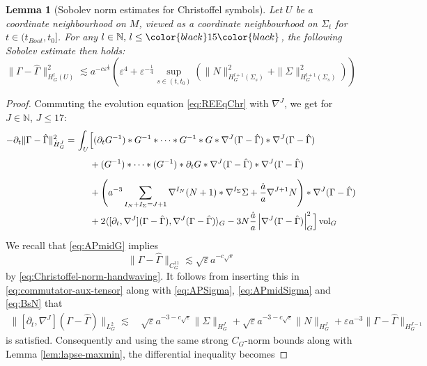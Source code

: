 \documentclass[11pt,leqno,textwidth=10cm]{amsart}
\numberwithin{equation}{section}
\theoremstyle{definition}
\theoremstyle{plain}
\newtheorem{lemma}[definition]{Lemma}
\newcommand{\1}{\mathbbm{1}}
\newcommand{\N}{\mathbb{N}}
\newcommand{\vol}[1]{{\text{\normalfont{vol}}}_{#1}}
\renewcommand{\epsilon}{\varepsilon}
\newcommand{\del}{\partial}
\newcommand{\Gamhat}{\hat{\Gamma}}
\newcommand{\change}[1]{\color{black}#1\color{black}}
\begin{document}
\begin{lemma}[Sobolev norm estimates for Christoffel symbols]\label{lem:int-est-Chr} Let $U$ be a coordinate neighbourhood on $M$, viewed as a coordinate neighbourhood on $\Sigma_t$ for $t\in(t_{Boot},t_0]$. For any $l\in\N,\,l\leq \change{15}$, the following Sobolev estimate then holds:
\begin{equation}\label{eq:norm-est-Chr}
\|\Gamma-\Gamhat\|^2_{H^l_G(U)}\lesssim a^{-c\epsilon^\frac18}\left(\epsilon^4+\epsilon^{-\frac14}\sup_{s\in(t,t_0)}\left(\|N\|_{H^{l+1}_G(\Sigma_s)}^2+\|\Sigma\|_{H^{l+1}_G(\Sigma_s)}^2\right)\right)
\end{equation}
\end{lemma}
\begin{proof}
Commuting the evolution equation \eqref{eq:REEqChr} with $\nabla^J$, we get for $J\in\N$, $J\leq 17$:
\begin{align*}
-\del_t\|\Gamma-\Gamhat\|_{\dot{H}^J_G}^2=&\,\int_U\Bigr[(\del_tG^{-1})\ast G^{-1}\ast\dots\ast G^{-1}\ast G\ast\nabla^J(\Gamma-\Gamhat)\ast\nabla^J(\Gamma-\Gamhat)\\
&\,\phantom{\int_M}+(G^{-1})\ast\dots\ast(G^{-1})\ast\del_tG\ast\nabla^J(\Gamma-\Gamhat)\ast\nabla^J(\Gamma-\Gamhat)\\
&\,\phantom{\int_M}+\left(a^{-3}\sum_{I_N+I_\Sigma=J+1}\nabla^{I_N}(N+1)\ast\nabla^{I_\Sigma}\Sigma+\frac{\dot{a}}a\nabla^{J+1}N\right)\ast\nabla^J(\Gamma-\Gamhat)\\
&\,\phantom{\int_M}+2\langle[\del_t,\nabla^J](\Gamma-\Gamhat),\nabla^J(\Gamma-\Gamhat)\rangle_G-3N\frac{\dot{a}}a\left\lvert\nabla^J(\Gamma-\Gamhat)\right\rvert_G^2\Bigr]\,\vol{G}
\end{align*}
We recall that \eqref{eq:APmidG} implies
\begin{equation}\label{eq:APChr}
\|\Gamma-\Gamhat\|_{C^{11}_G}\lesssim\sqrt{\epsilon}a^{-c\sqrt{\epsilon}}
\end{equation}
by \eqref{eq:Christoffel-norm-handwaving}. It follows from inserting this in \eqref{eq:commutator-aux-tensor} along with \eqref{eq:APSigma}, \eqref{eq:APmidSigma} and \eqref{eq:BsN} that
\begin{align*}
\|[\del_t,\nabla^J](\Gamma-\Gamhat)\|_{L^2_G}\lesssim&\, \sqrt{\epsilon}a^{-3-c\sqrt{\epsilon}}\|\Sigma\|_{H^J_G}+\sqrt{\epsilon} a^{-3-c\sqrt{\epsilon}}\|N\|_{H^J_G}+\epsilon a^{-3}\|\Gamma-\Gamhat\|_{H^{J-1}_G}
\end{align*}
is satisfied. Consequently and using the same strong $C_G$-norm bounds along with Lemma \ref{lem:lapse-maxmin}, the differential inequality becomes

\end{proof}
\end{document}
